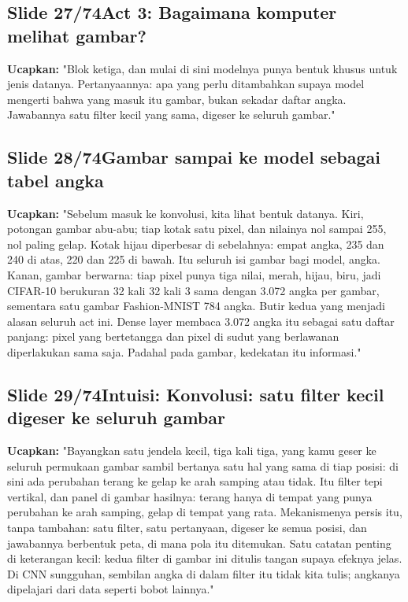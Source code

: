\documentclass[11pt]{article}
\renewcommand{\framebox}[1]{\colorbox{acc!15}{\textcolor{acc}{\textbf{#1}}}}
\begin{document}
\subsection*{\framebox{Slide 27/74}\quad Act 3: Bagaimana komputer melihat gambar?}
\textbf{Ucapkan:} "Blok ketiga, dan mulai di sini modelnya punya bentuk khusus untuk jenis datanya. Pertanyaannya: apa yang perlu ditambahkan supaya model mengerti bahwa yang masuk itu gambar, bukan sekadar daftar angka. Jawabannya satu filter kecil yang sama, digeser ke seluruh gambar."\\[2pt]

\subsection*{\framebox{Slide 28/74}\quad Gambar sampai ke model sebagai tabel angka}
\textbf{Ucapkan:} "Sebelum masuk ke konvolusi, kita lihat bentuk datanya. Kiri, potongan gambar abu-abu; tiap kotak satu pixel, dan nilainya nol sampai 255, nol paling gelap. Kotak hijau diperbesar di sebelahnya: empat angka, 235 dan 240 di atas, 220 dan 225 di bawah. Itu seluruh isi gambar bagi model, angka. Kanan, gambar berwarna: tiap pixel punya tiga nilai, merah, hijau, biru, jadi CIFAR-10 berukuran 32 kali 32 kali 3 sama dengan 3.072 angka per gambar, sementara satu gambar Fashion-MNIST 784 angka. Butir kedua yang menjadi alasan seluruh act ini. Dense layer membaca 3.072 angka itu sebagai satu daftar panjang: pixel yang bertetangga dan pixel di sudut yang berlawanan diperlakukan sama saja. Padahal pada gambar, kedekatan itu informasi."\\[2pt]

\subsection*{\framebox{Slide 29/74}\quad Intuisi: Konvolusi: satu filter kecil digeser ke seluruh gambar}
\textbf{Ucapkan:} "Bayangkan satu jendela kecil, tiga kali tiga, yang kamu geser ke seluruh permukaan gambar sambil bertanya satu hal yang sama di tiap posisi: di sini ada perubahan terang ke gelap ke arah samping atau tidak. Itu filter tepi vertikal, dan panel di gambar hasilnya: terang hanya di tempat yang punya perubahan ke arah samping, gelap di tempat yang rata. Mekanismenya persis itu, tanpa tambahan: satu filter, satu pertanyaan, digeser ke semua posisi, dan jawabannya berbentuk peta, di mana pola itu ditemukan. Satu catatan penting di keterangan kecil: kedua filter di gambar ini ditulis tangan supaya efeknya jelas. Di CNN sungguhan, sembilan angka di dalam filter itu tidak kita tulis; angkanya dipelajari dari data seperti bobot lainnya."\\[2pt]
\end{document}
